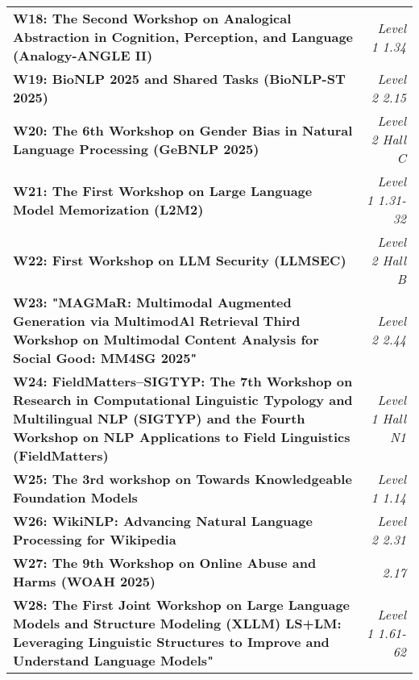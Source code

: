 \begin{tabularx}{\textwidth}{>{\raggedright}X r}

    \textbf{W18: The Second Workshop on Analogical Abstraction in Cognition, Perception, and Language (Analogy-ANGLE II)} &
    \textit{Level 1 1.34} \\

    \textbf{W19: BioNLP 2025 and Shared Tasks (BioNLP-ST 2025)} &
    \textit{Level 2 2.15} \\

    \textbf{W20: The 6th Workshop on Gender Bias in Natural Language Processing (GeBNLP 2025)} &
    \textit{Level 2 Hall C} \\

    \textbf{W21: The First Workshop on Large Language Model Memorization (L2M2)} &
    \textit{Level 1 1.31-32} \\

    \textbf{W22: First Workshop on LLM Security (LLMSEC)} &
    \textit{Level 2 Hall B} \\

    \textbf{W23: "MAGMaR: Multimodal Augmented Generation via MultimodAl Retrieval 
Third Workshop on Multimodal Content Analysis for Social Good: MM4SG 2025"} &
    \textit{Level 2 2.44} \\

    \textbf{W24: FieldMatters–SIGTYP: The 7th Workshop on Research in Computational Linguistic Typology and Multilingual NLP (SIGTYP) 
and the Fourth Workshop on NLP Applications to Field Linguistics (FieldMatters)} &
    \textit{Level 1 Hall N1} \\

    \textbf{W25: The 3rd workshop on Towards Knowledgeable Foundation Models} &
    \textit{Level 1 1.14} \\

    \textbf{W26: WikiNLP: Advancing Natural Language Processing for Wikipedia } &
    \textit{Level 2 2.31} \\

    \textbf{W27: The 9th Workshop on Online Abuse and Harms (WOAH 2025) } &
    \textit{2.17} \\

    \textbf{W28: The First Joint Workshop on Large Language Models and Structure Modeling (XLLM)
LS+LM: Leveraging Linguistic Structures to Improve and Understand Language Models"} &
    \textit{Level 1 1.61-62} \\

\end{tabularx}


